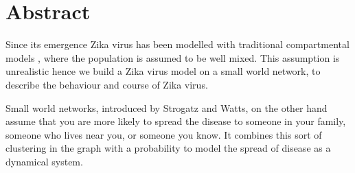 
\chapter*{Abstract} 
Since its emergence Zika virus has been modelled with traditional compartmental models , where the population is assumed to be well mixed. This assumption is unrealistic hence  we build a Zika virus model on a small world network, to describe the behaviour and course of Zika virus.

Small world networks, introduced by Strogatz and Watts, on the other hand assume that you are more likely to spread the disease to someone in your family, someone who lives near you, or someone you know. It combines this sort of clustering in the graph with a probability to model the spread of disease as a dynamical system.





